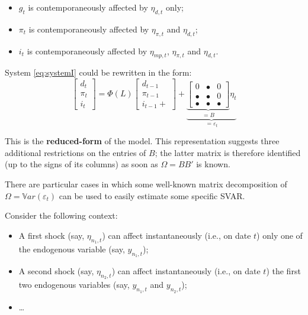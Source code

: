 \documentclass[
  12pt,
]{book}
\providecommand{\tightlist}{%
  \setlength{\itemsep}{0pt}\setlength{\parskip}{0pt}}
\theoremstyle{definition}
\theoremstyle{definition}
\theoremstyle{definition}
\theoremstyle{definition}
\theoremstyle{remark}
\begin{document}
\begin{itemize}
\tightlist
\item
  \(g_t\) is contemporaneously affected by \(\eta_{d,t}\) only;
\item
  \(\pi_t\) is contemporaneously affected by \(\eta_{\pi,t}\) and \(\eta_{d,t}\);
\item
  \(i_t\) is contemporaneously affected by \(\eta_{mp,t}\), \(\eta_{\pi,t}\) and \(\eta_{d,t}\).
\end{itemize}

System \eqref{eq:systemI} could be rewritten in the form:
\begin{equation}
\left[\begin{array}{c}
d_t\\
\pi_t\\
i_t
\end{array}\right]
= \Phi(L)
\left[\begin{array}{c}
d_{t-1}\\
\pi_{t-1}\\
i_{t-1} +
\end{array}\right] +\underbrace{\underbrace{
\left[
\begin{array}{ccc}
0 & \bullet & 0 \\
\bullet & \bullet & 0 \\
\bullet & \bullet & \bullet
\end{array}
\right]}_{=B} \eta_t}_{=\varepsilon_t}\label{eq:BBBB}
\end{equation}

This is the \textbf{reduced-form} of the model. This representation suggests three additional restrictions on the entries of \(B\); the latter matrix is therefore identified (up to the signs of its columns) as soon as \(\Omega = BB'\) is known.

There are particular cases in which some well-known matrix decomposition of \(\Omega=\mathbb{V}ar(\varepsilon_t)\) can be used to easily estimate some specific SVAR.

Consider the following context:

\begin{itemize}
\tightlist
\item
  A first shock (say, \(\eta_{n_1,t}\)) can affect instantaneously
  (i.e., on date \(t\)) only one of the endogenous variable (say, \(y_{n_1,t}\));
\item
  A second shock (say, \(\eta_{n_2,t}\)) can affect instantaneously
  (i.e., on date \(t\)) the first two endogenous variables (say, \(y_{n_1,t}\)
  and \(y_{n_2,t}\));
\item
  \ldots{}
\end{itemize}
\end{document}
